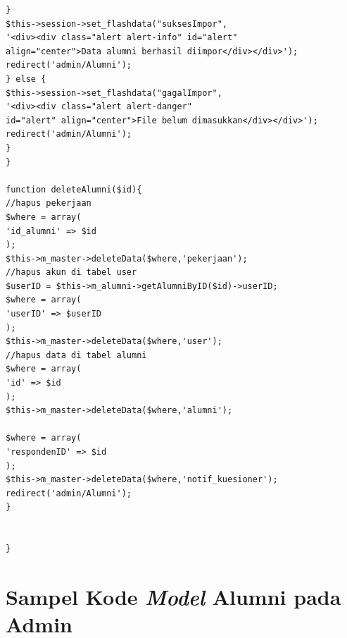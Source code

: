 \begin{verbatim}
}
$this->session->set_flashdata("suksesImpor", 
'<div><div class="alert alert-info" id="alert" 
align="center">Data alumni berhasil diimpor</div></div>');
redirect('admin/Alumni');
} else {
$this->session->set_flashdata("gagalImpor", 
'<div><div class="alert alert-danger" 
id="alert" align="center">File belum dimasukkan</div></div>');
redirect('admin/Alumni');
}
}

function deleteAlumni($id){
//hapus pekerjaan
$where = array(
'id_alumni' => $id
);
$this->m_master->deleteData($where,'pekerjaan');
//hapus akun di tabel user
$userID = $this->m_alumni->getAlumniByID($id)->userID;
$where = array(
'userID' => $userID
);
$this->m_master->deleteData($where,'user');
//hapus data di tabel alumni
$where = array(
'id' => $id
);
$this->m_master->deleteData($where,'alumni');

$where = array(
'respondenID' => $id
);
$this->m_master->deleteData($where,'notif_kuesioner');
redirect('admin/Alumni');
}


}

\end{verbatim}



\chapter{Sampel Kode \textit{Model} Alumni pada Admin}

